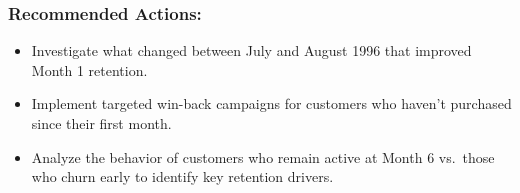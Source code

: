\documentclass[
  letterpaper,
  DIV=11,
  numbers=noendperiod]{scrartcl}
\providecommand{\tightlist}{%
  \setlength{\itemsep}{0pt}\setlength{\parskip}{0pt}}\usepackage{longtable,booktabs,array}
\begin{document}
\subsubsection{Recommended Actions:}\label{recommended-actions}

\begin{itemize}
\tightlist
\item
  Investigate what changed between July and August 1996 that improved
  Month 1 retention.
\item
  Implement targeted win-back campaigns for customers who haven't
  purchased since their first month.
\item
  Analyze the behavior of customers who remain active at Month 6
  vs.~those who churn early to identify key retention drivers.
\end{itemize}
\end{document}
